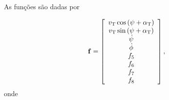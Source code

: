 \documentclass[sublist]{fei}
\begin{document}
As funções são dadas por

\begin{equation} \label{functionNonlinear}
    {\bf f} = \left[ \begin{array}{c} v_{\rm T} \cos \left(\psi + \alpha_{\rm T} \right) \\ v_{\rm T} \sin \left(\psi + \alpha_{\rm T} \right) \\ \dot{\psi} \\ \dot{\phi} \\ f_5 \\ f_6 \\ f_7 \\ f_8 \\  \end{array} \right],
\end{equation}
onde
\end{document}
